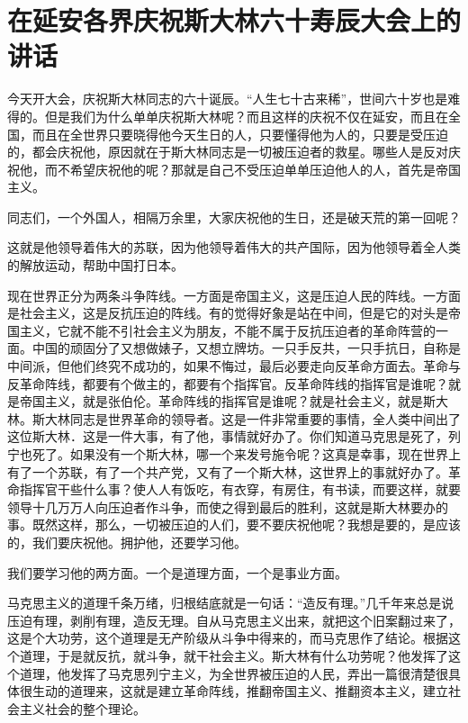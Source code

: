 \section[在延安各界庆祝斯大林六十寿辰大会上的讲话（一九三九年十二月二十一日）]{在延安各界庆祝斯大林六十寿辰大会上的讲话}


今天开大会，庆祝斯大林同志的六十诞辰。“人生七十古来稀”，世间六十岁也是难得的。但是我们为什么单单庆祝斯大林呢？而且这样的庆祝不仅在延安，而且在全国，而且在全世界只要晓得他今天生日的人，只要懂得他为人的，只要是受压迫的，都会庆祝他，原因就在于斯大林同志是一切被压迫者的救星。哪些人是反对庆祝他，而不希望庆祝他的呢？那就是自己不受压迫单单压迫他人的人，首先是帝国主义。

同志们，一个外国人，相隔万余里，大家庆祝他的生日，还是破天荒的第一回呢？

这就是他领导着伟大的苏联，因为他领导着伟大的共产国际，因为他领导着全人类的解放运动，帮助中国打日本。

现在世界正分为两条斗争阵线。一方面是帝国主义，这是压迫人民的阵线。一方面是社会主义，这是反抗压迫的阵线。有的觉得好象是站在中间，但是它的对头是帝国主义，它就不能不引社会主义为朋友，不能不属于反抗压迫者的革命阵营的一面。中国的顽固分了又想做婊子，又想立牌坊。一只手反共，一只手抗日，自称是中间派，但他们终究不成功的，如果不悔过，最后必要走向反革命方面去。革命与反革命阵线，都要有个做主的，都要有个指挥官。反革命阵线的指挥官是谁呢？就是帝国主义，就是张伯伦。革命阵线的指挥官是谁呢？就是社会主义，就是斯大林。斯大林同志是世界革命的领导者。这是一件非常重要的事情，全人类中间出了这位斯大林．这是一件大事，有了他，事情就好办了。你们知道马克思是死了，列宁也死了。如果没有一个斯大林，哪一个来发号施令呢？这真是幸事，现在世界上有了一个苏联，有了一个共产党，又有了一个斯大林，这世界上的事就好办了。革命指挥官干些什么事？使人人有饭吃，有衣穿，有房住，有书读，而要这样，就要领导十几万万人向压迫者作斗争，而使之得到最后的胜利，这就是斯大林要办的事。既然这样，那么，一切被压迫的人们，要不要庆祝他呢？我想是要的，是应该的，我们要庆祝他。拥护他，还要学习他。

我们要学习他的两方面。一个是道理方面，一个是事业方面。

马克思主义的道理千条万绪，归根结底就是一句话：“造反有理。”几千年来总是说压迫有理，剥削有理，造反无理。自从马克思主义出来，就把这个旧案翻过来了，这是个大功劳，这个道理是无产阶级从斗争中得来的，而马克思作了结论。根据这个道理，于是就反抗，就斗争，就干社会主义。斯大林有什么功劳呢？他发挥了这个道理，他发挥了马克思列宁主义，为全世界被压迫的人民，弄出一篇很清楚很具体很生动的道理来，这就是建立革命阵线，推翻帝国主义、推翻资本主义，建立社会主义社会的整个理论。

